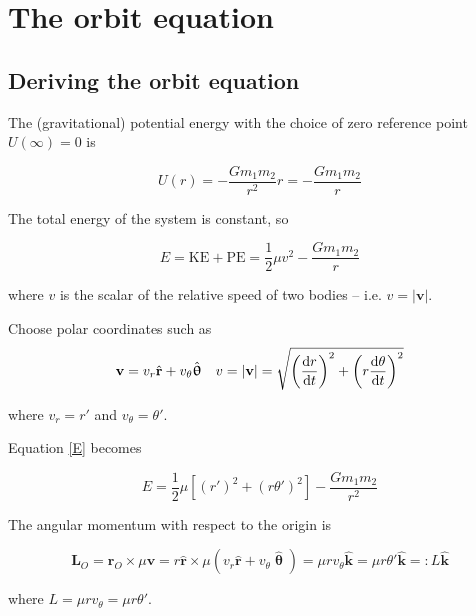 \section{The orbit equation}

\subsection{Deriving the orbit equation}
\begin{frame}{\subsecname}

The (gravitational) potential energy with the choice of zero reference point \(U(\infty) = 0\) is 

\begin{equation}
U(r) = - \frac{Gm_1m_2}{r^2} r =- \frac{Gm_1m_2}{r}
\end{equation}

The total energy of the system is constant, so

\begin{equation}
E = \text{KE} + \text{PE} = \frac{1}{2}\mu v^2 - \frac{Gm_1m_2}{r} \label{E}
\end{equation}

where \(v\) is the scalar of the relative speed of two bodies -- i.e. \(v = |\mathbf{v}|\).
\end{frame}

\begin{frame}{\subsecname}
Choose polar coordinates such as 
\begin{align}
\mathbf{v} = v_r \hat{\mathbf{r}} + v_\theta \hat{\boldsymbol{\uptheta}} &&
v = |\mathbf{v}| = \sqrt{\left(\dv{r}{t}\right)^2 + \left(r\dv{\theta}{t}\right)^2}
\end{align}

where \(v_r = r'\) and \(v_\theta = \theta'\).

Equation \ref{E} becomes

\begin{equation}
E = \frac{1}{2} \mu \left[ (r')^2 + (r\theta')^2 \right] - \frac{Gm_1m_2}{r^2} \label{E2}
\end{equation}

\end{frame}

\begin{frame}{\subsecname}
The angular momentum with respect to the origin is 

\begin{equation}
\mathbf{L}_O = \mathbf{r}_O \times \mu\mathbf{v}= r\hat{\mathbf{r}} \times \mu(v_r\hat{\mathbf{r}} + v_\theta\hat{\boldsymbol{\uptheta}}) = \mu rv_\theta \hat{\mathbf{k}} = \mu r \theta' \hat{\mathbf{k}} =: L\hat{\mathbf{k}}
\end{equation}

where \(L = \mu rv_\theta = \mu r \theta'\)\footnotemark.

\end{frame}

